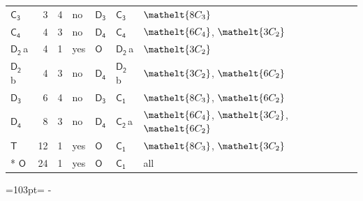 \documentclass[10pt,a4paper]{article}
\newcommand{\needspace}[1]{\par\penalty-100\begingroup\dimen0=#1\relax\dimen2=\pagegoal
  \advance\dimen2-\pagetotal\ifdim\dimen0>\dimen2\relax\ifdim\dimen2>0pt\vfil\break\fi\fi
  \endgroup}
\numberwithin{equation}{section}
\newcommand{\eltfont}[1]{{\let\sigma\eltsigma\mathelt{#1}}}
\newcommand{\grp}[1]{\mathsf{#1}}
\newcommand{\cls}[1]{\eltfont{#1}}
\newcommand{\clsletter}[1]{\,{\scriptsize\color{black!55}#1}}
\newlength{\fillwidth}\newlength{\cellwidth}\newlength{\colwidth}
\begin{document}
{\begin{longtable}{@{}lrrlll>{\RaggedRight\arraybackslash}p{\fillwidth}@{}}
\href{C3.pdf}{$\grp{C_{3}}$} & 3 & 4 & no & \href{D3.pdf}{$\grp{D_{3}}$} & \href{C3.pdf}{$\grp{C_{3}}$} & $\cls{8C_{3}}$\\
\href{C4.pdf}{$\grp{C_{4}}$} & 4 & 3 & no & \href{D4.pdf}{$\grp{D_{4}}$} & \href{C4.pdf}{$\grp{C_{4}}$} & $\cls{6C_{4}}$, $\cls{3C_{2}}$\\
\href{D2.pdf}{$\grp{D_{2}}$}\clsletter{a} & 4 & 1 & yes & \href{O.pdf}{$\grp{O}$} & \href{D2.pdf}{$\grp{D_{2}}$}\clsletter{a} & $\cls{3C_{2}}$\\
\href{D2.pdf}{$\grp{D_{2}}$}\clsletter{b} & 4 & 3 & no & \href{D4.pdf}{$\grp{D_{4}}$} & \href{D2.pdf}{$\grp{D_{2}}$}\clsletter{b} & $\cls{3C_{2}}$, $\cls{6C_{2}}$\\
\href{D3.pdf}{$\grp{D_{3}}$} & 6 & 4 & no & \href{D3.pdf}{$\grp{D_{3}}$} & \href{C1.pdf}{$\grp{C_{1}}$} & $\cls{8C_{3}}$, $\cls{6C_{2}}$\\
\href{D4.pdf}{$\grp{D_{4}}$} & 8 & 3 & no & \href{D4.pdf}{$\grp{D_{4}}$} & \href{C2.pdf}{$\grp{C_{2}}$}\clsletter{a} & $\cls{6C_{4}}$, $\cls{3C_{2}}$, $\cls{6C_{2}}$\\
\href{T.pdf}{$\grp{T}$} & 12 & 1 & yes & \href{O.pdf}{$\grp{O}$} & \href{C1.pdf}{$\grp{C_{1}}$} & $\cls{8C_{3}}$, $\cls{3C_{2}}$\\*
\href{O.pdf}{$\grp{O}$} & 24 & 1 & yes & \href{O.pdf}{$\grp{O}$} & \href{C1.pdf}{$\grp{C_{1}}$} & all\\
\bottomrule\end{longtable}}
\needspace{103pt}
\end{document}
